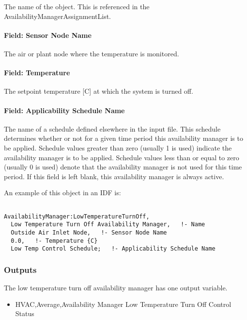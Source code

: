 The name of the object. This is referenced in the AvailabilityManagerAssignmentList.

\paragraph{Field: Sensor Node Name}\label{field-sensor-node-name-2}

The air or plant node where the temperature is monitored.

\paragraph{Field: Temperature}\label{field-temperature-2}

The setpoint temperature {[}C{]} at which the system is turned off.

\paragraph{Field: Applicability Schedule Name}\label{field-applicability-schedule-name}

The name of a schedule defined elsewhere in the input file. This schedule determines whether or not for a given time period this availability manager is to be applied. Schedule values greater than zero (usually 1 is used) indicate the availability manager is to be applied. Schedule values less than or equal to zero (usually 0 is used) denote that the availability manager is not used for this time period. If this field is left blank, this availability manager is always active.

An example of this object in an IDF is:

\begin{lstlisting}

AvailabilityManager:LowTemperatureTurnOff,
  Low Temperature Turn Off Availability Manager,   !- Name
  Outside Air Inlet Node,   !- Sensor Node Name
  0.0,   !- Temperature {C}
  Low Temp Control Schedule;   !- Applicability Schedule Name
\end{lstlisting}

\subsubsection{Outputs}\label{outputs-6-010}

The low temperature turn off availability manager has one output variable.

\begin{itemize}
\tightlist
\item
  HVAC,Average,Availability Manager Low Temperature Turn Off Control Status
\end{itemize}

